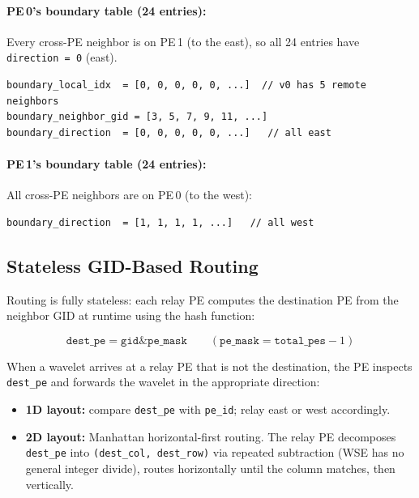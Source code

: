\documentclass[11pt,letterpaper]{article}
\begin{document}
\paragraph{PE\,0's boundary table (24 entries):}

Every cross-PE neighbor is on PE\,1 (to the east), so all 24 entries have \texttt{direction\,=\,0} (east).

\begin{lstlisting}[numbers=none, caption={PE\,0 boundary: first 5 entries (all for $v_0$)}]
boundary_local_idx  = [0, 0, 0, 0, 0, ...]  // v0 has 5 remote neighbors
boundary_neighbor_gid = [3, 5, 7, 9, 11, ...]
boundary_direction  = [0, 0, 0, 0, 0, ...]   // all east
\end{lstlisting}

\paragraph{PE\,1's boundary table (24 entries):}

All cross-PE neighbors are on PE\,0 (to the west):

\begin{lstlisting}[numbers=none]
boundary_direction  = [1, 1, 1, 1, ...]   // all west
\end{lstlisting}

\subsection{Stateless GID-Based Routing}

Routing is fully stateless: each relay PE computes the destination PE from the neighbor GID at runtime using the hash function:

\[
  \texttt{dest\_pe} = \texttt{gid} \mathbin{\&} \texttt{pe\_mask} \qquad (\texttt{pe\_mask} = \texttt{total\_pes} - 1)
\]

When a wavelet arrives at a relay PE that is not the destination, the PE inspects \texttt{dest\_pe} and forwards the wavelet in the appropriate direction:
\begin{itemize}[nosep]
  \item \textbf{1D layout:} compare \texttt{dest\_pe} with \texttt{pe\_id}; relay east or west accordingly.
  \item \textbf{2D layout:} Manhattan horizontal-first routing. The relay PE decomposes \texttt{dest\_pe} into \texttt{(dest\_col, dest\_row)} via repeated subtraction (WSE has no general integer divide), routes horizontally until the column matches, then vertically.
\end{itemize}
\end{document}
